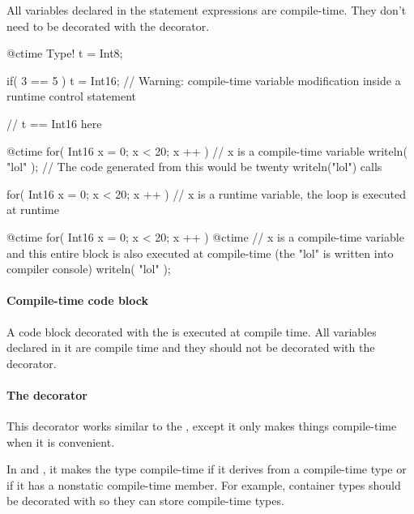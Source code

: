 All variables declared in the statement expressions are compile-time. They don't need to be decorated with the  decorator.

\begin{code}
@ctime Type! t = Int8;

if( 3 == 5 )
	t = Int16; // Warning: compile-time variable modification inside a runtime control statement

// t == Int16 here
\end{code}

\begin{code}
@ctime for( Int16 x = 0; x < 20; x ++ ) {
	// x is a compile-time variable
	writeln( "lol" );
	// The code generated from this would be twenty writeln("lol") calls
}

for( Int16 x = 0; x < 20; x ++ ) {
	// x is a runtime variable, the loop is executed at runtime	
}

@ctime for( Int16 x = 0; x < 20; x ++ ) @ctime {
	// x is a compile-time variable and this entire block is also executed at compile-time (the "lol" is written into compiler console)
	writeln( "lol" );
}

\end{code}

\paragraph{Compile-time code block} A code block decorated with the  is executed at compile time. All variables declared in it are compile time and they should not be decorated with the  decorator.

\paragraph{The  decorator} \label{decorator:autoCtime} This decorator works similar to the , except it only makes things compile-time when it is convenient.

In  and , it makes the type compile-time if it derives from a compile-time type or if it has a nonstatic compile-time member. For example, container types should be decorated with  so they can store compile-time types.


